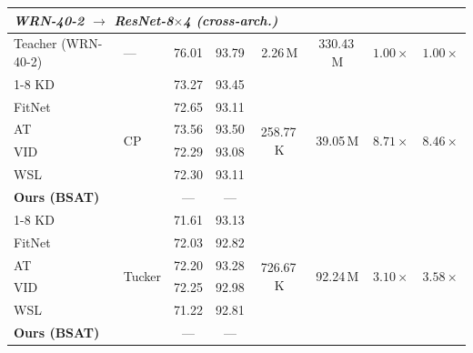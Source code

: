 \documentclass[conference]{IEEEtran}
\begin{document}
\begin{table}[t]
\begin{tabular}{llcccccc}
    \multicolumn{8}{l}{\textit{WRN-40-2 $\to$ ResNet-8$\times$4 {\scriptsize(cross-arch.)}}} \\
    \midrule
    Teacher (WRN-40-2)   & — & 76.01 & 93.79 & 2.26\,M & 330.43\,M & $1.00\times$ & $1.00\times$ \\
    \cline{1-8}
    KD \cite{hinton2015distilling}                 & \multirow{6}{*}{CP}     & 73.27 & 93.45 & \multirow{6}{*}{258.77\,K} & \multirow{6}{*}{39.05\,M} & \multirow{6}{*}{$8.71\times$} & \multirow{6}{*}{$8.46\times$} \\
    FitNet \cite{romero2015fitnetshintsdeepnets}   &                         & 72.65 & 93.11 & & & & \\
    AT \cite{zagoruyko2016paying}                  &                         & 73.56 & 93.50 & & & & \\
    VID \cite{ahn2019variational}                  &                         & 72.29 & 93.08 & & & & \\
    WSL \cite{zhou2021rethinking}                  &                         & 72.30 & 93.11 & & & & \\
    \textbf{Ours (BSAT)}                           &                         & — & — & & & & \\
    \cline{1-8}
    KD \cite{hinton2015distilling}                 & \multirow{6}{*}{Tucker} & 71.61 & 93.13 & \multirow{6}{*}{726.67\,K} & \multirow{6}{*}{92.24\,M} & \multirow{6}{*}{$3.10\times$} & \multirow{6}{*}{$3.58\times$} \\
    FitNet \cite{romero2015fitnetshintsdeepnets}   &                         & 72.03 & 92.82 & & & & \\
    AT \cite{zagoruyko2016paying}                  &                         & 72.20 & 93.28 & & & & \\
    VID \cite{ahn2019variational}                  &                         & 72.25 & 92.98 & & & & \\
    WSL \cite{zhou2021rethinking}                  &                         & 71.22 & 92.81 & & & & \\
    \textbf{Ours (BSAT)}                           &                         & — & — & & & & \\
    \midrule


\end{tabular}
\end{table}
\end{document}
